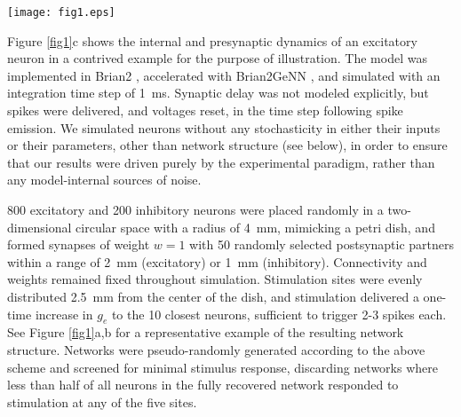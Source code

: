 \documentclass[pdflatex,referee,iicol,sn-basic]{sn-jnl}
\theoremstyle{thmstyleone}%
\theoremstyle{thmstyletwo}%
\theoremstyle{thmstylethree}%
\begin{document}
\begin{figure*}%
    \centering
    \texttt{[image: fig1.eps]}
    \caption{\textbf{a} Sample network layout, showing excitatory and inhibitory neurons and all outgoing synaptic connections from a small subset. \textbf{b} Distance from stimulation site 0 in terms of minimum number of excitatory synapses. Stimulation is provided to the 10 neurons nearest to each of 5 stimulation sites, which are regularly spaced on a circle with a radius of 2.5 mm. \textbf{c} Membrane and synaptic dynamics of a neuron innervated by an excitatory and an inhibitory neuron firing pre-determined spikes. The excitatory connection has weight $w = 3$ for demonstration purposes only; a single connection with $w = 1$ is normally unable to evoke postsynaptic firing. Top: Membrane voltage (black, $\tau$ = 30 ms), firing threshold baseline (gray) and adaptive threshold (green, $\tau$ = 1 s) demonstrating TA. Middle: Excitatory ($g_e$, $\tau$ = 2 ms) and inhibitory ($g_i$, $\tau$ = 4 ms) synaptic conductances, demonstrating excitatory STD. Bottom: Inputs to $g_e$ and $g_i$ (vertical bars), and the depression variable $x$ of the excitatory presynaptic neuron (dashed line)}
    \label{fig1}
\end{figure*}

Figure \ref{fig1}c shows the internal and presynaptic dynamics of an excitatory neuron in a contrived example for the purpose of illustration. The model was implemented in Brian2 \citep{Stimberg2019-tc}, accelerated with Brian2GeNN \citep{Stimberg2020-go}, and simulated with an integration time step of 1~ms. Synaptic delay was not modeled explicitly, but spikes were delivered, and voltages reset, in the time step following spike emission. We simulated neurons without any stochasticity in either their inputs or their parameters, other than network structure (see below), in order to ensure that our results were driven purely by the experimental paradigm, rather than any model-internal sources of noise.

800 excitatory and 200 inhibitory neurons were placed randomly in a two-dimensional circular space with a radius of 4~mm, mimicking a petri dish, and formed synapses of weight $w=1$ with 50 randomly selected postsynaptic partners within a range of 2~mm (excitatory) or 1~mm (inhibitory). Connectivity and weights remained fixed throughout simulation. Stimulation sites were evenly distributed 2.5~mm from the center of the dish, and stimulation delivered a one-time increase in $g_e$ to the 10 closest neurons, sufficient to trigger 2-3 spikes each. See Figure \ref{fig1}a,b for a representative example of the resulting network structure. Networks were pseudo-randomly generated according to the above scheme and screened for minimal stimulus response, discarding networks where less than half of all neurons in the fully recovered network responded to stimulation at any of the five sites.
\end{document}
